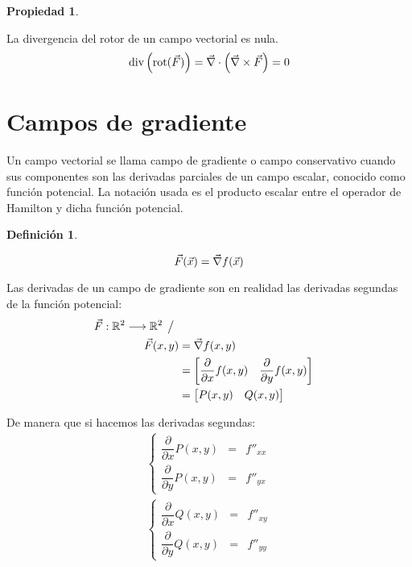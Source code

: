 \documentclass[a5paper,12pt,twoside]{book}
\newtheorem{defn}{{Definición}}[chapter]
\newtheorem{prop}{{Propiedad}}[chapter]
\begin{document}
\begin{mdframed}[style=PropertyFrame]
    \begin{prop}
    \end{prop}
    La divergencia del rotor de un campo vectorial es nula.
    \begin{equation*}
        \operatorname{div} \left( \operatorname{rot}(\Vec{F}) \right) = \Vec{\nabla} \cdot \left( \Vec{\nabla} \times \Vec{F} \right) = 0
    \end{equation*}
\end{mdframed}


\section{Campos de gradiente}

Un campo vectorial se llama campo de gradiente o campo conservativo cuando sus componentes son las derivadas parciales de un campo escalar, conocido como función potencial.
La notación usada es el producto escalar entre el operador de Hamilton y dicha función potencial.

\begin{mdframed}[style=DefinitionFrame]
    \begin{defn}
    \end{defn}
    \begin{equation*}
        \Vec{F}(\Vec{x}) = \Vec{\nabla} f(\Vec{x})
    \end{equation*}
\end{mdframed}

Las derivadas de un campo de gradiente son en realidad las derivadas segundas de la función potencial:
\begin{align*}
    \Vec{F}: \mathbb{R}^2 \longrightarrow \mathbb{R}^2 \hspace{1ex} \big/ \hspace{1ex}
    \\
    \Vec{F}(x,y) &= \Vec{\nabla} f(x,y)
    \\
    &= \begin{bmatrix}
        \dfrac{\partial}{\partial x} f(x,y) &     \dfrac{\partial}{\partial y} f(x,y)
    \end{bmatrix}
    \\
    &= \begin{bmatrix} P(x,y) & Q(x,y) \end{bmatrix}
\end{align*}

De manera que si hacemos las derivadas segundas:
\begin{gather*}
    \left\{
    \begin{aligned}
        \dfrac{\partial}{\partial x} P(x,y) &=& f''_{xx}
        \\[1ex]
        \dfrac{\partial}{\partial y} P(x,y) &=& f''_{yx}
    \end{aligned}
    \right.
    \\[1em]
    \left\{
    \begin{aligned}
        \dfrac{\partial}{\partial x} Q(x,y) &=& f''_{xy}
        \\[1ex]
        \dfrac{\partial}{\partial y} Q(x,y) &=& f''_{yy}
    \end{aligned}
    \right.
\end{gather*}
\end{document}
